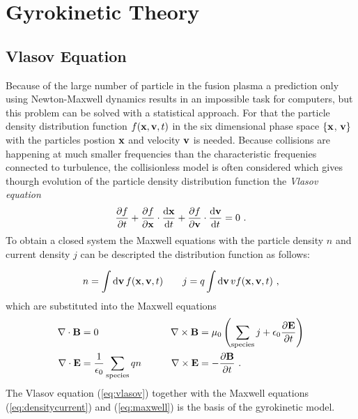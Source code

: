 \newpage
\section{Gyrokinetic Theory}
\label{sec:gyrokinetic}

\subsection{Vlasov Equation}
\label{sub:vlasov}

Because of the large number of particle in the fusion plasma a prediction only using Newton-Maxwell dynamics results in an impossible task for computers, but this problem can be solved with a statistical approach. For that the particle density distribution function $f(\boldsymbol{\mathbf{x}}, \boldsymbol{\mathbf{v}}, t)$ in the six dimensional phase space $\{\boldsymbol{\mathbf{x}}$, $\boldsymbol{\mathbf{v}}\}$ with the particles postion $\boldsymbol{\mathbf{x}}$ and velocity $\boldsymbol{\mathbf{v}}$ is needed. Because collisions are happening at much smaller frequencies than the characteristic frequenies connected to turbulence, the collisionless model is often considered \cite{Garbet2010} which gives thourgh evolution of the particle density distribution function the \textit{Vlasov equation}
\begin{gather}
	\frac{\partial f}{\partial t} + \frac{\partial f}{\partial \boldsymbol{\mathbf{x}}} \cdot \frac{\mathrm{d}\boldsymbol{\mathbf{x}}}{\mathrm{d}t} + \frac{\partial f}{\partial \boldsymbol{\mathbf{v}}} \cdot \frac{\mathrm{d}\boldsymbol{\mathbf{v}}}{\mathrm{d}t} = 0~.
	\label{eq:vlasov}
\end{gather}
To obtain a closed system the Maxwell equations with the particle density $n$ and current density $j$ can be descripted the distribution function as follows:

\begin{gather}
	n = \int \mathrm{d}\boldsymbol{\mathbf{v}}\,f(\boldsymbol{\mathbf{x}}, \boldsymbol{\mathbf{v}}, t) \qquad j = q \int \mathrm{d}\boldsymbol{\mathbf{v}}\, v f(\boldsymbol{\mathbf{x}}, \boldsymbol{\mathbf{v}}, t)~,
	\label{eq:densitycurrent}
\end{gather}
which are substituted into the Maxwell equations
\begin{gather}
	\begin{aligned}
		\nabla \cdot \boldsymbol{\mathbf{B}} &= 0 &\qquad \nabla \times \boldsymbol{\mathbf{B}} &= \mu_0\left( \sum_\mathrm{species} j + \epsilon_0 \frac{\partial \boldsymbol{\mathbf{E}}}{\partial t} \right) \\
		\nabla \cdot \boldsymbol{\mathbf{E}} &= \frac{1}{\epsilon_0} \sum_\mathrm{species} qn &\qquad \nabla \times \boldsymbol{\mathbf{E}} &= - \frac{\partial \boldsymbol{\mathbf{B}}}{\partial t}~.
	\end{aligned}
	\label{eq:maxwell}
\end{gather}
The Vlasov equation (\ref{eq:vlasov}) together with the Maxwell equations (\ref{eq:densitycurrent}) and (\ref{eq:maxwell}) is the basis of the gyrokinetic model. \cite{Krommes2012}


